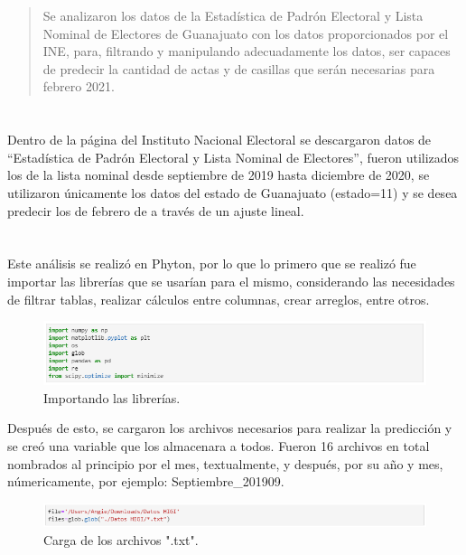 \documentclass[12pt]{article}
\begin{document}
 
  \begin{abstract} 
  Se analizaron los datos de la Estadística de Padrón Electoral y Lista Nominal de Electores de Guanajuato con los datos proporcionados por el INE, para, filtrando y manipulando adecuadamente los datos, ser capaces de predecir la cantidad de actas y de casillas que serán necesarias para febrero 2021.
  \end{abstract}


\setlength{\topmargin}{0mm}

 \section{}
 Dentro de la página del Instituto Nacional Electoral \cite{INE} se descargaron datos de “Estadística de Padrón Electoral y Lista Nominal de Electores”, fueron utilizados los de la lista nominal desde septiembre de 2019 hasta diciembre de 2020, se utilizaron únicamente los datos del estado de Guanajuato (estado=11) y se desea predecir los de febrero de  a través de un ajuste lineal.
 
  \section{}
 Este análisis se realizó en Phyton, por lo que lo primero que se realizó fue importar las librerías que se usarían para el mismo, considerando las necesidades de filtrar tablas, realizar cálculos entre columnas, crear arreglos, entre otros.
  \begin{figure}[h] 
  \centering 
    \includegraphics[width=12cm]{Imagen1.png}
        \caption{Importando las librerías.}
        \label{fig:16}
        \end{figure}  
        
Después de esto, se cargaron los archivos necesarios para realizar la predicción y se creó una variable que los almacenara a todos. Fueron 16 archivos en total nombrados al principio por el mes, textualmente, y después, por su año y mes, númericamente, por ejemplo: Septiembre\_201909.
  \begin{figure}[h] 
  \centering 
    \includegraphics[width=12cm]{Imagen2.png}
        \caption{Carga de los archivos ".txt".}
        \label{fig:17}
        \end{figure} 
         
\end{document}
